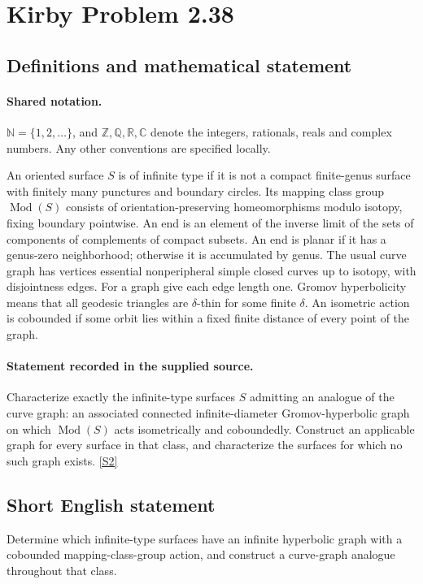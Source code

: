 \documentclass[11pt]{article}
\newcommand{\sref}[2]{\hyperlink{source:#1:#2}{[S#2]}}
\begin{document}
\section{Kirby Problem 2.38}\label{statement}

\subsection{Definitions and mathematical statement}

\paragraph{Shared notation.}$\mathbb N=\{1,2,\ldots\}$, and $\mathbb Z,\mathbb Q,\mathbb R,\mathbb C$ denote the integers, rationals, reals and complex numbers. Any other conventions are specified locally.


An oriented surface $S$ is of infinite type if it is not a compact finite-genus surface with finitely many punctures and boundary circles. Its mapping class group $\operatorname{Mod}(S)$ consists of orientation-preserving homeomorphisms modulo isotopy, fixing boundary pointwise. An end is an element of the inverse limit of the sets of components of complements of compact subsets. An end is planar if it has a genus-zero neighborhood; otherwise it is accumulated by genus. The usual curve graph has vertices essential nonperipheral simple closed curves up to isotopy, with disjointness edges. For a graph give each edge length one. Gromov hyperbolicity means that all geodesic triangles are $\delta$-thin for some finite $\delta$. An isometric action is cobounded if some orbit lies within a fixed finite distance of every point of the graph.
\paragraph{Statement recorded in the supplied source.}
Characterize exactly the infinite-type surfaces $S$ admitting an analogue of the curve graph: an associated connected infinite-diameter Gromov-hyperbolic graph on which $\operatorname{Mod}(S)$ acts isometrically and coboundedly. Construct an applicable graph for every surface in that class, and characterize the surfaces for which no such graph exists. \sref{statement}{2}

\subsection{Short English statement}
Determine which infinite-type surfaces have an infinite hyperbolic graph with a cobounded mapping-class-group action, and construct a curve-graph analogue throughout that class.
\end{document}
